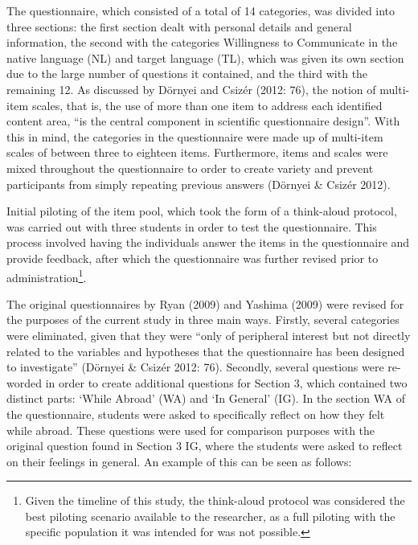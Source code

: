 \documentclass[12pt]{article}
\newenvironment{styleStandard}{\setlength\leftskip{0cm}\setlength\rightskip{0cm plus 1fil}\setlength\parindent{0cm}\setlength\parfillskip{0pt plus 1fil}\setlength\parskip{0in plus 1pt}\writerlistparindent\writerlistleftskip\leavevmode\normalfont\normalsize\writerlistlabel\ignorespaces}{\unskip\vspace{0.111in plus 0.0111in}\par}
\newcommand\writerlistleftskip{}
\newcommand\writerlistparindent{}
\newcommand\writerlistlabel{}
\begin{document}
\begin{styleStandard}
The questionnaire, which consisted of a total of 14 categories, was divided into three sections: the first section dealt with personal details and general information, the second with the categories Willingness to Communicate in the native language (NL) and target language (TL), which was given its own section due to the large number of questions it contained, and the third with the remaining 12. As discussed by Dörnyei and Csizér (2012: 76), the notion of multi-item scales, that is, the use of more than one item to address each identified content area, “is the central component in scientific questionnaire design”. With this in mind, the categories in the questionnaire were made up of multi-item scales of between three to eighteen items. Furthermore, items and scales were mixed throughout the questionnaire to order to create variety and prevent participants from simply repeating previous answers (Dörnyei \& Csizér 2012).
\end{styleStandard}

\begin{styleStandard}
Initial piloting of the item pool, which took the form of a think-aloud protocol, was carried out with three students in order to test the questionnaire. This process involved having the individuals answer the items in the questionnaire and provide feedback, after which the questionnaire was further revised prior to administration\footnote{ Given the timeline of this study, the think-aloud protocol was considered the best piloting scenario available to the researcher, as a full piloting with the specific population it was intended for was not possible.}.
\end{styleStandard}

\begin{styleStandard}
The original questionnaires by Ryan (2009) and Yashima (2009) were revised for the purposes of the current study in three main ways. Firstly, several categories were eliminated, given that they were “only of peripheral interest but not directly related to the variables and hypotheses that the questionnaire has been designed to investigate” (Dörnyei \& Csizér 2012: 76). Secondly, several questions were re-worded in order to create additional questions for Section 3, which contained two distinct parts: ‘While Abroad’ (WA) and ‘In General’ (IG). In the section WA of the questionnaire, students were asked to specifically reflect on how they felt while abroad. These questions were used for comparison purposes with the original question found in Section 3 IG, where the students were asked to reflect on their feelings in general. An example of this can be seen as follows:
\end{styleStandard}
\end{document}
